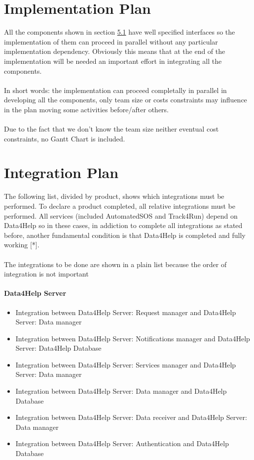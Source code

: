 	\section{Implementation Plan}
		All the components shown in section \hyperref[sect:5.1]{5.1} have well specified interfaces so the implementation of them can proceed in parallel without any particular implementation dependency. Obviously this means that at the end of the implementation will be needed an important effort in integrating all the components.\\ \\
		In short words: the implementation can proceed completally in parallel in developing all the components, only team size or costs constraints may influence in the plan moving some activities before/after others. \\ \\ Due to the fact that we don't know the team size neither eventual cost constraints, no Gantt Chart is included.

	\section{Integration Plan}
		The following list, divided by product, shows which integrations must be performed. To declare a product completed, all relative integrations must be performed. All services (included AutomatedSOS and Track4Run) depend on Data4Help so in these cases, in addiction to complete all integrations as stated before, another fundamental condition is that Data4Help is completed and fully working [*].\\ \\
		The integrations to be done are shown in a plain list because the order of integration is not important

		\paragraph{Data4Help Server}
		\begin{itemize}
			\item{Integration between Data4Help Server: Request manager and Data4Help Server: Data manager}
			\item{Integration between Data4Help Server: Notifications manager and Data4Help Server: Data4Help Database}
			\item{Integration between Data4Help Server: Services manager and Data4Help Server: Data manager}
			\item{Integration between Data4Help Server: Data manager and Data4Help Database}
			\item{Integration between Data4Help Server: Data receiver and Data4Help Server: Data manager}
			\item{Integration between Data4Help Server: Authentication and Data4Help Database}
		\end{itemize}

